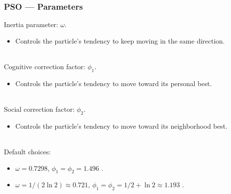 \documentclass[xcolor=dvipsnames]{beamer}
\begin{document}
\begin{frame}
\frametitle{PSO --- Parameters}
{\color{red}Inertia} parameter: $\omega$.
\begin{itemize}
\item Controls the particle's tendency to keep moving in the same direction.\\~\\
\end{itemize}

{\color{red}Cognitive} correction factor: $\phi_1$.
\begin{itemize}
\item Controls the particle's tendency to move toward its personal best.\\~\\
\end{itemize}

{\color{red}Social} correction factor: $\phi_2$.
\begin{itemize}
\item Controls the particle's tendency to move toward its neighborhood best.\\~\\
\end{itemize}

Default choices:
\begin{itemize}
\item $\omega = 0.7298$, $\phi_1 = \phi_2 = 1.496$ \citep{clerc2002particle}.
\item $\omega = 1/(2\ln 2)\approx 0.721$, $\phi_1=\phi_2=1/2 + \ln 2\approx 1.193$ \citep{clerc2006stagnation}.
\end{itemize}

\end{frame}
\end{document}
